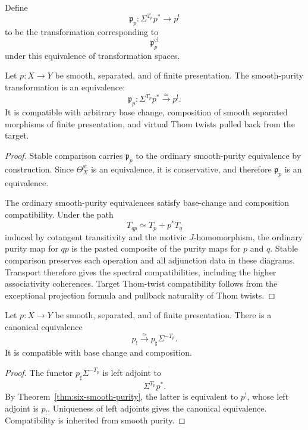 \begin{construction}
Define
\[
    \mathfrak p_p:
    \Sigma^{T_p}p^*
    \longrightarrow
    p^!
\]
to be the transformation corresponding to
\[
    \mathfrak p^{\mathrm{cl}}_p
\]
under this equivalence of transformation spaces.
\end{construction}

\begin{theorem}
\label{thm:six-smooth-purity}
Let \(p:X\to Y\) be smooth, separated, and of finite presentation.  The
smooth-purity transformation is an equivalence:
\[
    \mathfrak p_p:
    \Sigma^{T_p}p^*
    \xrightarrow{\simeq}
    p^!.
\]
It is compatible with arbitrary base change, composition of smooth
separated morphisms of finite presentation, and virtual Thom twists pulled
back from the target.
\end{theorem}

\begin{proof}
Stable comparison carries \(\mathfrak p_p\) to the ordinary smooth-purity
equivalence by construction.  Since \(\Theta_X^{\mathrm{st}}\) is an
equivalence, it is conservative, and therefore \(\mathfrak p_p\) is an
equivalence.

The ordinary smooth-purity equivalences satisfy base-change and composition
compatibility.  Under the path
\[
    T_{qp}
    \simeq
    T_p+p^*T_q
\]
induced by cotangent transitivity and the motivic \(J\)-homomorphism, the
ordinary purity map for \(qp\) is the pasted composite of the purity maps
for \(p\) and \(q\).  Stable comparison preserves each operation and all
adjunction data in these diagrams.  Transport therefore gives the spectral
compatibilities, including the higher associativity coherences.  Target
Thom-twist compatibility follows from the exceptional projection formula
and pullback naturality of Thom twists.
\end{proof}

\begin{corollary}
\label{cor:smooth-exceptional-direct-image}
Let \(p:X\to Y\) be smooth, separated, and of finite presentation.  There
is a canonical equivalence
\[
    p_!
    \xrightarrow{\simeq}
    p_\sharp\Sigma^{-T_p}.
\]
It is compatible with base change and composition.
\end{corollary}

\begin{proof}
The functor \(p_\sharp\Sigma^{-T_p}\) is left adjoint to
\[
    \Sigma^{T_p}p^*.
\]
By Theorem~\ref{thm:six-smooth-purity}, the latter is equivalent to \(p^!\),
whose left adjoint is \(p_!\).  Uniqueness of left adjoints gives the
canonical equivalence.  Compatibility is inherited from smooth purity.
\end{proof}

